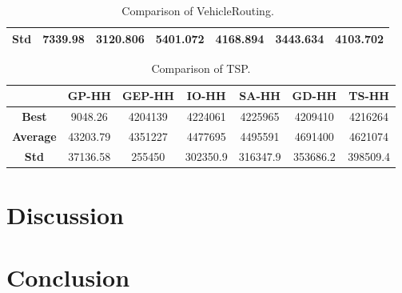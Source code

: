 \documentclass[a4paper,12pt]{article}
\begin{document}
{\begin{table}[ht]
\begin{tabular}{| c | c | c | c | c| c| c|}
                    \hline
                    \textbf{Std} & 7339.98 & 3120.806& 5401.072& 4168.894& 3443.634&4103.702\\
                    \hline
                \end{tabular}
                \caption{Comparison of VehicleRouting.} 
        \end{table}
        \begin{table}[ht] 
                \small 
                \centering
                \begin{tabular}{| c | c | c | c | c| c| c|} 
                    \hline   
                    &\textbf{GP-HH} & \textbf{GEP-HH} & \textbf{IO-HH} & \textbf{SA-HH} & \textbf{GD-HH} & \textbf{TS-HH} \\
                    \hline
                    \textbf{Best} & 9048.26 & 4204139 & 4224061& 4225965& 4209410& 4216264\\
                    \hline
                    \textbf{Average} & 43203.79 & 4351227 & 4477695 & 4495591& 4691400& 4621074\\
                    \hline
                    \textbf{Std} & 37136.58 & 255450 & 302350.9& 316347.9 & 353686.2 & 398509.4\\
                    \hline
                \end{tabular}
                \caption{Comparison of TSP.} 
        \end{table}

    }
    
\section{Discussion} \label{sec:discussion}
    \par{

    }
\section{Conclusion} \label{sec:conclusion}
    \par{

    }
\newpage
% 

\end{document}
